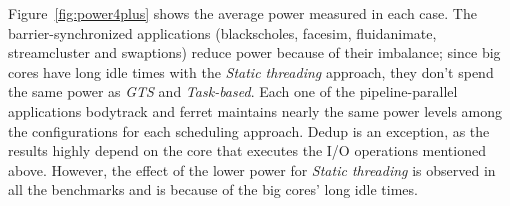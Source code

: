 Figure~\ref{fig:power4plus} shows the average power measured in each case. The barrier-synchronized applications (blackscholes, facesim, fluidanimate, streamcluster and swaptions) reduce power because of their imbalance; since big cores have long idle times with the \emph{Static threading} approach, they don't spend the same power as \emph{GTS} and \emph{Task-based}.
Each one of the pipeline-parallel applications bodytrack and ferret maintains nearly the same power levels among the configurations for each scheduling approach. Dedup is an exception, as the results highly depend on the core that executes the I/O operations mentioned above. However, the effect of the lower power for \emph{Static threading} is observed in all the benchmarks and is because of the big cores' long idle times.








